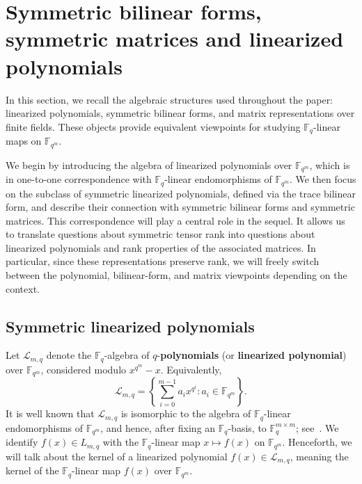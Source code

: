 \documentclass[11pt,a4paper,reqno]{article}
\numberwithin{equation}{section}
\theoremstyle{definition}
\newcommand{\numberset}{\mathbb}
\newcommand{\F}{\numberset{F}}
\newcommand{\fq}{\F_q}
\begin{document}
\section{Symmetric bilinear forms, symmetric matrices and linearized polynomials}\label{sec:1}

In this section, we recall the algebraic structures used throughout the paper:
linearized polynomials, symmetric bilinear forms, and matrix representations
over finite fields. These objects provide equivalent viewpoints for studying
\(\mathbb F_q\)-linear maps on \(\mathbb F_{q^m}\).

We begin by introducing the algebra of linearized polynomials over
\(\mathbb F_{q^m}\), which is in one-to-one correspondence with
\(\mathbb F_q\)-linear endomorphisms of \(\mathbb F_{q^m}\). We then focus on
the subclass of symmetric linearized polynomials, defined via the trace
bilinear form, and describe their connection with symmetric bilinear forms and symmetric matrices. This correspondence will play a central role in the sequel. It allows us to
translate questions about symmetric tensor rank into questions about
linearized polynomials and rank properties of the associated matrices. In
particular, since these representations preserve rank, we will freely switch
between the polynomial, bilinear-form, and matrix viewpoints depending on the
context.


\subsection{Symmetric linearized polynomials}

Let \(\mathcal L_{m,q}\) denote the \(\mathbb F_q\)-algebra of \(q\)-\textbf{polynomials} (or \textbf{linearized polynomial})
over \(\mathbb F_{q^m}\), considered modulo \(x^{q^m}-x\). Equivalently,
\[
\mathcal L_{m,q}
=
\left\{
\sum_{i=0}^{m-1} a_i x^{q^i}: a_i\in \mathbb F_{q^m}
\right\}.
\]
It is well known that \(\mathcal L_{m,q}\) is isomorphic to the algebra of
\(\mathbb F_q\)-linear endomorphisms of \(\mathbb F_{q^m}\), and hence, after
fixing an \(\mathbb F_q\)-basis, to \(\mathbb F_q^{m\times m}\); see~\cite{WU201379}.
We identify \(f(x)\in L_{m,q}\) with the \(\mathbb F_q\)-linear map
\(x\mapsto f(x)\) on \(\mathbb F_{q^m}\). Henceforth, we will talk about the kernel of a linearized polynomial $f(x) \in \mathcal{L}_{m,q}$, meaning the kernel of the $\fq$-linear map $f(x)$ over $\mathbb{F}_{q^m}$.
\end{document}
